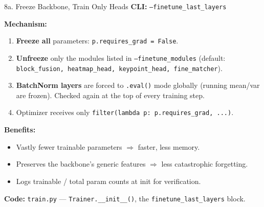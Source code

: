 \documentclass[aspectratio=169, 12pt]{beamer}
\begin{document}
\begin{frame}{8a. Freeze Backbone, Train Only Heads}
\small
\textbf{CLI:} \texttt{--finetune\_last\_layers}

\medskip
\textbf{Mechanism:}
\begin{enumerate}\setlength{\itemsep}{2pt}
    \item \textbf{Freeze all} parameters: \texttt{p.requires\_grad = False}.
    \item \textbf{Unfreeze} only the modules listed in \texttt{--finetune\_modules}
          (default: \texttt{block\_fusion, heatmap\_head, keypoint\_head, fine\_matcher}).
    \item \textbf{BatchNorm layers} are forced to \texttt{.eval()} mode globally
          (running mean/var are frozen). Checked again at the top of every training step.
    \item Optimizer receives only \texttt{filter(lambda p: p.requires\_grad, ...)}.
\end{enumerate}

\medskip
\textbf{Benefits:}
\begin{itemize}\setlength{\itemsep}{1pt}
    \item Vastly fewer trainable parameters $\Rightarrow$ faster, less memory.
    \item Preserves the backbone's generic features $\Rightarrow$ less catastrophic forgetting.
    \item Logs trainable / total param counts at init for verification.
\end{itemize}

\textbf{Code:} \texttt{train.py} --- \texttt{Trainer.\_\_init\_\_()}, the
\texttt{finetune\_last\_layers} block.
\end{frame}
\end{document}
